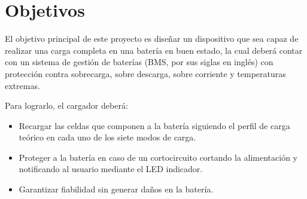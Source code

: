 \section{Objetivos}

El objetivo principal de este proyecto es diseñar un dispositivo que sea capaz de realizar una carga completa en una batería 
en buen estado, la cual deberá contar con un sistema de gestión de baterías (BMS, por sus siglas en inglés)
con protección contra sobrecarga, sobre descarga, sobre corriente y temperaturas extremas.

Para lograrlo, el cargador deberá:
\begin{itemize}
    \item Recargar las celdas que componen a la batería siguiendo el perfil de carga teórico en cada uno de los siete modos de carga.
    \item Proteger a la batería en caso de un cortocircuito cortando la alimentación y notificando al usuario mediante el LED indicador.
    \item Garantizar fiabilidad sin generar daños en la batería.
\end{itemize}